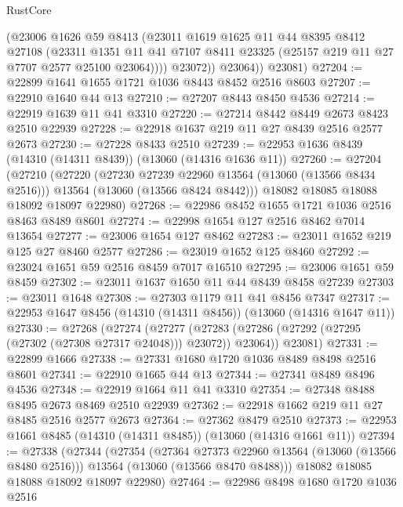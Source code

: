 \begin{lexlean}{RustCore}
\begin{coremodule}
              (@23006
                @1626
                @59
                @8413
                (@23011
                  @1619
                  @1625
                  @11
                  @44
                  @8395
                  @8412
                  @27108
                  (@23311
                    @1351
                    @11
                    @41
                    @7107
                    @8411
                    @23325
                    (@25157 @219 @11 @27 @7707 @2577 @25100 @23064))))
              @23072))
          @23064))
      @23081)
@27204 := @22899 @1641 @1655 @1721 @1036 @8443 @8452 @2516 @8603
@27207 := @22910 @1640 @44 @13
@27210 := @27207 @8443 @8450 @4536
@27214 := @22919 @1639 @11 @41 @3310
@27220 := @27214 @8442 @8449 @2673 @8423 @2510 @22939
@27228 := @22918 @1637 @219 @11 @27 @8439 @2516 @2577 @2673
@27230 := @27228 @8433 @2510
@27239 := @22953 @1636 @8439 (@14310 (@14311 @8439)) (@13060 (@14316 @1636 @11))
@27260 := @27204
    (@27210
      (@27220
        (@27230 @27239 @22960 @13564 (@13060 (@13566 @8434 @2516)))
        @13564
        (@13060 (@13566 @8424 @8442)))
      @18082
      @18085
      @18088
      @18092
      @18097
      @22980)
@27268 := @22986 @8452 @1655 @1721 @1036 @2516 @8463 @8489 @8601
@27274 := @22998 @1654 @127 @2516 @8462 @7014 @13654
@27277 := @23006 @1654 @127 @8462
@27283 := @23011 @1652 @219 @125 @27 @8460 @2577
@27286 := @23019 @1652 @125 @8460
@27292 := @23024 @1651 @59 @2516 @8459 @7017 @16510
@27295 := @23006 @1651 @59 @8459
@27302 := @23011 @1637 @1650 @11 @44 @8439 @8458 @27239
@27303 := @23011 @1648
@27308 := @27303 @1179 @11 @41 @8456 @7347
@27317 := @22953 @1647 @8456 (@14310 (@14311 @8456)) (@13060 (@14316 @1647 @11))
@27330 := @27268
    (@27274
      (@27277 (@27283 (@27286 (@27292 (@27295 (@27302 (@27308 @27317 @24048))) @23072)) @23064))
      @23081)
@27331 := @22899 @1666
@27338 := @27331 @1680 @1720 @1036 @8489 @8498 @2516 @8601
@27341 := @22910 @1665 @44 @13
@27344 := @27341 @8489 @8496 @4536
@27348 := @22919 @1664 @11 @41 @3310
@27354 := @27348 @8488 @8495 @2673 @8469 @2510 @22939
@27362 := @22918 @1662 @219 @11 @27 @8485 @2516 @2577 @2673
@27364 := @27362 @8479 @2510
@27373 := @22953 @1661 @8485 (@14310 (@14311 @8485)) (@13060 (@14316 @1661 @11))
@27394 := @27338
    (@27344
      (@27354
        (@27364 @27373 @22960 @13564 (@13060 (@13566 @8480 @2516)))
        @13564
        (@13060 (@13566 @8470 @8488)))
      @18082
      @18085
      @18088
      @18092
      @18097
      @22980)
@27464 := @22986
    @8498
    @1680
    @1720
    @1036
    @2516

\end{coremodule}
\end{lexlean}
